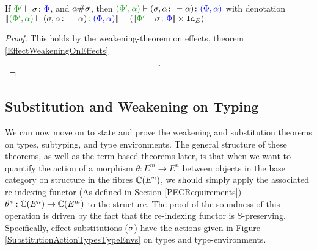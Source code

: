 \documentclass{Report}
\begin{document}
\begin{framed}
    \begin{lemma}\label{ExtensionLemmaOnEffectSubstitutions}
        If $\typerelation{\P'}{\si}{\P}$, and $\alpha\#\sigma$, then $\typerelation{(\P', \a)}{(\si, \a\setto\a)}{(\P,\a)}$ with denotation $\deno{\typerelation{(\P', \a)}{(\si, \a\setto\a)}{(\P,\a)}} = (\deno{\typerelation{\P'}{\si}{\P}}\times\Id{E})$
    \end{lemma}
    \begin{proof}
       This holds by the weakening-theorem on effects, theorem \ref{EffectWeakeningOnEffects}
    
       $$\square$$
    \end{proof}
\end{framed}


\subsection{Substitution and Weakening on Typing}
We can now move on to state and prove the weakening and substitution theorems on types, subtyping, and type environments. The general structure of these theorems, as well as the term-based theorems later, is that when we want to quantify the action of a morphism $\theta: E^m \rightarrow E^n$ between objects in the base category on structure in the fibres $\mathbb{C}(E^n)$, we should simply apply the associated re-indexing functor (As defined in Section \ref{PECRequirements}) $\theta^*: \mathbb{C}(E^n) \rightarrow \mathbb{C}(E^m)$ to the structure. The proof of the soundness of this operation is driven by the fact that the re-indexing functor is S-preserving. Specifically, effect substitutions ($\sigma$) have the actions given in Figure \ref{SubstitutionActionTypesTypeEnvs} on types and type-environments.
\end{document}
